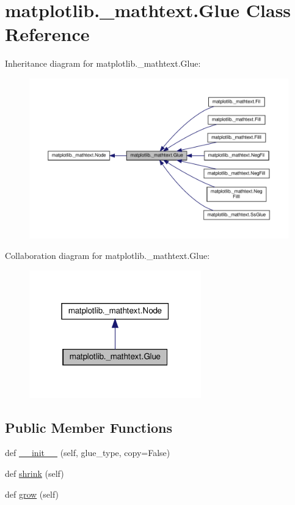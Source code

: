 \hypertarget{classmatplotlib_1_1__mathtext_1_1Glue}{}\section{matplotlib.\+\_\+mathtext.\+Glue Class Reference}
\label{classmatplotlib_1_1__mathtext_1_1Glue}


Inheritance diagram for matplotlib.\+\_\+mathtext.\+Glue\+:
\nopagebreak
\begin{figure}[H]
\begin{center}
\leavevmode
\includegraphics[width=350pt]{classmatplotlib_1_1__mathtext_1_1Glue__inherit__graph}
\end{center}
\end{figure}


Collaboration diagram for matplotlib.\+\_\+mathtext.\+Glue\+:
\nopagebreak
\begin{figure}[H]
\begin{center}
\leavevmode
\includegraphics[width=211pt]{classmatplotlib_1_1__mathtext_1_1Glue__coll__graph}
\end{center}
\end{figure}
\subsection*{Public Member Functions}
\begin{DoxyCompactItemize}
\item 
def \hyperlink{classmatplotlib_1_1__mathtext_1_1Glue_a7c2aec847b25450593aa03a6cad4a184}{\+\_\+\+\_\+init\+\_\+\+\_\+} (self, glue\+\_\+type, copy=False)
\item 
def \hyperlink{classmatplotlib_1_1__mathtext_1_1Glue_a0c6571d22ba0913748e17277c41af20e}{shrink} (self)
\item 
def \hyperlink{classmatplotlib_1_1__mathtext_1_1Glue_a4886d21223d2ac04f2c05cff19d8d6c9}{grow} (self)
\end{DoxyCompactItemize}
